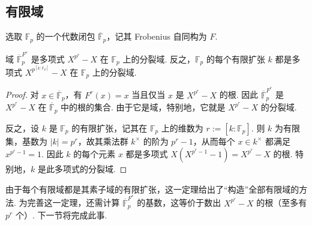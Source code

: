 \subsection{有限域}\label{sec:galois-2-4-4}
选取 $\mathbb F_p$ 的一个代数闭包 $\overline{\mathbb F}_p$，记其 Frobenius 自同构为 $F$.
\begin{theorem*}
域 $\overline{\mathbb F}_p^{F^r}$ 是多项式 $X^{p^r}-X$ 在 $\mathbb F_p$ 上的分裂域. 反之，$\mathbb F_p$ 的每个有限扩张 $k$ 都是多项式 $X^{p^{[k:\mathbb F_p]}}-X$ 在 $\mathbb F_p$ 上的分裂域.
\end{theorem*}
\begin{proof}
对 $x\in\overline{\mathbb F}_p$，有 $F^r(x)=x$ 当且仅当 $x$ 是 $X^{p^r}-X$ 的根. 因此 $\overline{\mathbb F}_p^{F^r}$ 是 $X^{p^r}-X$ 在 $\overline{\mathbb F}_p$ 中的根的集合. 由于它是域，特别地，它就是 $X^{p^r}-X$ 的分裂域.

反之，设 $k$ 是 $\mathbb F_p$ 的有限扩张，记其在 $\mathbb F_p$ 上的维数为 $r:=[k:\mathbb F_p]$. 则 $k$ 为有限集，基数为 $|k|=p^r$，故其乘法群 $k^\times$ 的阶为 $p^r-1$，从而每个 $x\in k^\times$ 都满足 $x^{p^r-1}=1$. 因此 $k$ 的每个元素 $x$ 都是多项式 $X(X^{p^r-1}-1)=X^{p^r}-X$ 的根. 特别地，$k$ 是此多项式的分裂域.
\end{proof}
由于每个有限域都是其素子域的有限扩张，这一定理给出了``构造''全部有限域的方法. 为完善这一定理，还需计算 $\overline{\mathbb F}_p^{F^r}$ 的基数，这等价于数出 $X^{p^r}-X$ 的根（至多有 $p^r$ 个）. 下一节将完成此事.

